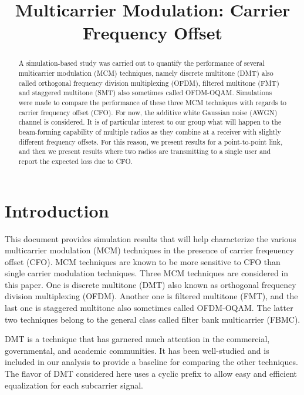 \documentclass[conference]{IEEEtran}
\begin{document}
\title{Multicarrier Modulation: Carrier Frequency Offset}
\author{
}

\maketitle

\begin{abstract}
A simulation-based study was carried out to quantify the performance of several
multicarrier modulation (MCM) techniques, namely discrete multitone (DMT) also
called orthogonal frequency division multiplexing (OFDM), filtered multitone (FMT)
and staggered multitone (SMT) also sometimes called OFDM-OQAM. Simulations were
made to compare the performance of these three MCM techniques with regards to
carrier frequency offset (CFO). For now, the additive white Gaussian noise (AWGN)
channel is considered. It is of particular interest to our group what will happen
to the beam-forming capability of multiple radios as they combine at a receiver
with slightly different frequency offsets. For this reason, we present results
for a point-to-point link, and then we present results where two radios are 
transmitting to a single user and report the expected loss due to CFO.
\end{abstract}

\section{Introduction}
\label{sec:intro}

This document provides simulation results that will help characterize the various
multicarrier modulation (MCM) techniques in the presence of carrier freqeuency
offset (CFO). MCM techniques are known to be more sensitive to CFO than single
carrier modulation techniques. Three MCM techniques are considered in this paper.
One is discrete multitone (DMT) also known as orthogonal frequency division
multiplexing (OFDM). Another one is filtered multitone (FMT), and the last one
is staggered multitone also sometimes called OFDM-OQAM. The latter two techniques
belong to the general class called filter bank multicarrier (FBMC). %

DMT is a technique that has garnered much attention in the commercial, governmental,
and academic communities. It has been well-studied and is included in our analysis
to provide a baseline for comparing the other techniques. The flavor of DMT considered
here uses a cyclic prefix to allow easy and efficient equalization for each subcarrier
signal.
\end{document}
